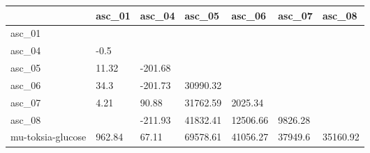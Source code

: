 \begin{tabular}{lllllll}
\toprule
{} &  asc\_01 &  asc\_04 &    asc\_05 &    asc\_06 &   asc\_07 &    asc\_08 \\
\midrule
asc\_01            &         &         &           &           &          &           \\
asc\_04            &    -0.5 &         &           &           &          &           \\
asc\_05            &   11.32 & -201.68 &           &           &          &           \\
asc\_06            &    34.3 & -201.73 &  30990.32 &           &          &           \\
asc\_07            &    4.21 &   90.88 &  31762.59 &   2025.34 &          &           \\
asc\_08            &         & -211.93 &  41832.41 &  12506.66 &  9826.28 &           \\
mu-toksia-glucose &  962.84 &   67.11 &  69578.61 &  41056.27 &  37949.6 &  35160.92 \\
\bottomrule
\end{tabular}
